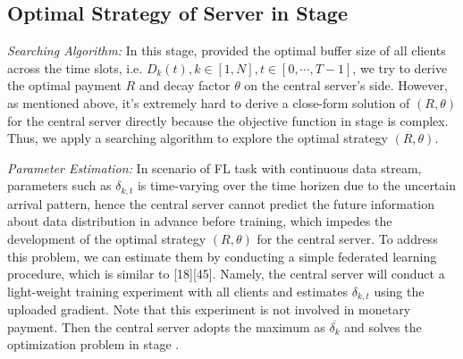 \documentclass{article}
\theoremstyle{plain}
\theoremstyle{definition}
\theoremstyle{remark}
\begin{document}
\subsection{Optimal Strategy of Server in Stage \uppercase\expandafter{}}
\textit{Searching Algorithm:} In this stage, provided the optimal buffer size of all clients across the time slots, i.e. $D_k(t), k \in [1,N], t \in [0,\cdots,T-1]$, we try to derive the optimal payment $R$ and decay factor $\theta$ on the central server's side.
However, as mentioned above, it's extremely hard to derive a close-form solution of $(R, \theta)$ for the central server directly because the objective function in stage \uppercase\expandafter{} is complex.
Thus, we apply a searching algorithm to explore the optimal strategy $(R,\theta)$.

\textit{Parameter Estimation:} In scenario of FL task with continuous data stream, parameters such as $\delta_{k,t}$ is time-varying over the time horizen due to the uncertain arrival pattern, hence the central server cannot predict the future information about data distribution in advance before training, which impedes the development of the optimal strategy $(R, \theta)$ for the central server.
To address this problem, we can estimate them by conducting a simple federated learning procedure, which is similar to [18][45]. Namely, the central server will conduct a light-weight training experiment with all clients and estimates $\delta_{k,t}$ using the uploaded gradient. Note that this experiment is not involved in monetary payment.
Then the central server adopts the maximum as $\overline{\delta_k}$ and solves the optimization problem in stage \uppercase\expandafter{}.
\end{document}

